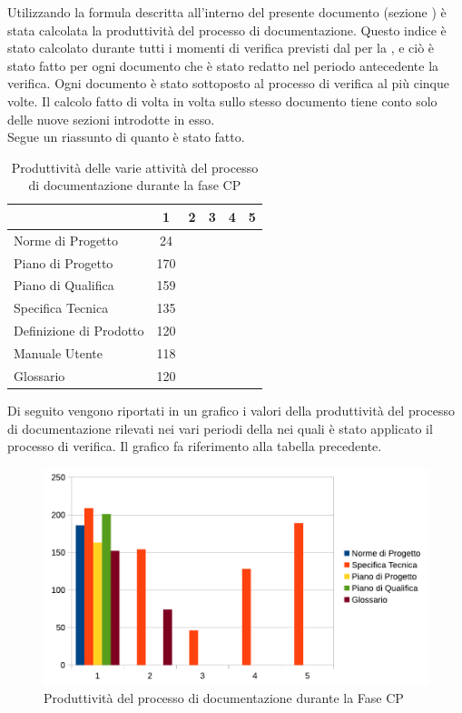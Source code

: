 Utilizzando la formula descritta all'interno del presente documento (sezione ) è stata calcolata la produttività del processo di documentazione. Questo indice è stato calcolato durante tutti i momenti di verifica previsti dal  per la , e ciò è stato fatto per ogni documento che è stato redatto nel periodo antecedente la verifica. Ogni documento è stato sottoposto al processo di verifica al più cinque volte. Il calcolo fatto di volta in volta sullo stesso documento tiene conto solo delle nuove sezioni introdotte in esso.\\
Segue un riassunto di quanto è stato fatto.
\begin{table}[H]
      \centering
		\begin{tabu}{| l | c | c | c | c | c |}
		\hline
		&1	&2	&3	&4	&5	\\ \hline
		Norme di Progetto	& 24 &	&	&	& \\ \hline
		Piano di Progetto	& 170 &	&	&	& \\ \hline
		Piano di Qualifica	& 159	&	&	&	&\\ \hline
		Specifica Tecnica & 135 & & & \\ \hline
		Definizione di Prodotto & 120 &	 	&	&  	&\\ \hline
		Manuale Utente & 118	&	&	&	& \\ \hline
		Glossario & 120 &  & & &\\ \hline
		\end{tabu}
		\caption{Produttività delle varie attività del processo di documentazione durante la fase CP}
\end{table}
Di seguito vengono riportati in un grafico i valori della produttività del processo di documentazione rilevati nei vari periodi della  nei quali è stato applicato il processo di verifica. Il grafico fa riferimento alla tabella precedente.\\
\begin{figure}[H]
	\centering
		\includegraphics[width=12cm]{PianoDiQualifica/Pics/ProduttivitaDocumentazioneFaseSD.pdf}
	\caption{Produttività del processo di documentazione durante la Fase CP}
\end{figure}
